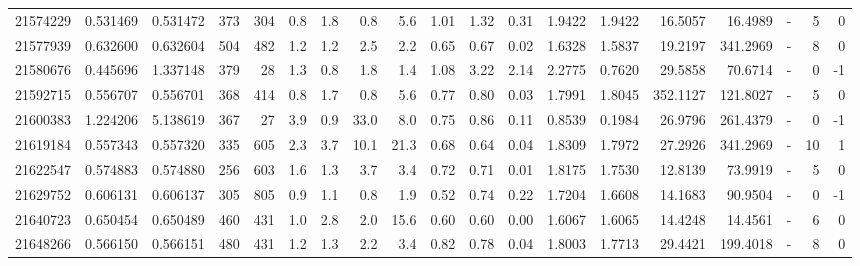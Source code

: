 \begin{tabular}{rrrrrrrrrrrrrrrrlrr}
  21574229 & 0.531469 &   0.531472 &  373 &  304 &      0.8 &      1.8 &     0.8 &      5.6 &       1.01 &        1.32 &        0.31 &  1.9422 &  1.9422 &   16.5057 &   16.4989 &             - &        5 &          0 \\
  21577939 & 0.632600 &   0.632604 &  504 &  482 &      1.2 &      1.2 &     2.5 &      2.2 &       0.65 &        0.67 &        0.02 &  1.6328 &  1.5837 &   19.2197 &  341.2969 &             - &        8 &          0 \\
  21580676 & 0.445696 &   1.337148 &  379 &   28 &      1.3 &      0.8 &     1.8 &      1.4 &       1.08 &        3.22 &        2.14 &  2.2775 &  0.7620 &   29.5858 &   70.6714 &             - &        0 &         -1 \\
  21592715 & 0.556707 &   0.556701 &  368 &  414 &      0.8 &      1.7 &     0.8 &      5.6 &       0.77 &        0.80 &        0.03 &  1.7991 &  1.8045 &  352.1127 &  121.8027 &             - &        5 &          0 \\
  21600383 & 1.224206 &   5.138619 &  367 &   27 &      3.9 &      0.9 &    33.0 &      8.0 &       0.75 &        0.86 &        0.11 &  0.8539 &  0.1984 &   26.9796 &  261.4379 &             - &        0 &         -1 \\
  21619184 & 0.557343 &   0.557320 &  335 &  605 &      2.3 &      3.7 &    10.1 &     21.3 &       0.68 &        0.64 &        0.04 &  1.8309 &  1.7972 &   27.2926 &  341.2969 &             - &       10 &          1 \\
  21622547 & 0.574883 &   0.574880 &  256 &  603 &      1.6 &      1.3 &     3.7 &      3.4 &       0.72 &        0.71 &        0.01 &  1.8175 &  1.7530 &   12.8139 &   73.9919 &             - &        5 &          0 \\
  21629752 & 0.606131 &   0.606137 &  305 &  805 &      0.9 &      1.1 &     0.8 &      1.9 &       0.52 &        0.74 &        0.22 &  1.7204 &  1.6608 &   14.1683 &   90.9504 &             - &        0 &         -1 \\
  21640723 & 0.650454 &   0.650489 &  460 &  431 &      1.0 &      2.8 &     2.0 &     15.6 &       0.60 &        0.60 &        0.00 &  1.6067 &  1.6065 &   14.4248 &   14.4561 &             - &        6 &          0 \\
  21648266 & 0.566150 &   0.566151 &  480 &  431 &      1.2 &      1.3 &     2.2 &      3.4 &       0.82 &        0.78 &        0.04 &  1.8003 &  1.7713 &   29.4421 &  199.4018 &             - &        8 &          0 \\

\end{tabular}
